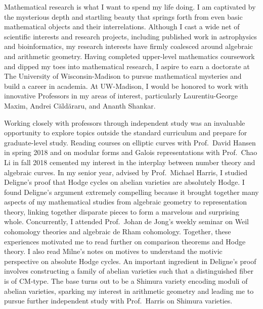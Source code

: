 \documentclass[11pt]{article}
\begin{document}
Mathematical research is what I want to spend my life doing. I am captivated by the mysterious depth and startling beauty that springs forth from even basic mathematical objects and their interrelations. Although I cast a wide net of scientific interests and research projects, including published work in astrophysics and bioinformatics, my research interests have firmly coalesced around algebraic and arithmetic geometry. Having completed upper-level mathematics coursework and dipped my toes into mathematical research, I aspire to earn a doctorate at The University of Wisconsin-Madison to pursue mathematical mysteries and build a career in academia. At UW-Madison, I would be honored to work with innovative Professors in my areas of interest, particularly Laurentiu-George Maxim, Andrei Căldăraru, and Ananth Shankar. 
\par
Working closely with professors through independent study was an invaluable opportunity to explore topics outside the standard curriculum and prepare for graduate-level study. 
Reading courses on elliptic curves with Prof.\ David Hansen in spring 2018 and on modular forms and Galois representations with Prof.\ Chao Li in fall 2018 cemented my interest in the interplay between number theory and algebraic curves. In my senior year, advised by Prof.\ Michael Harris, I studied Deligne's proof that Hodge cycles on abelian varieties are absolutely Hodge. I found Deligne's argument extremely compelling because it brought together many aspects of my mathematical studies from algebraic geometry to representation theory, linking together disparate pieces to form a marvelous and surprising whole. Concurrently, I attended Prof.\ Johan de Jong's weekly seminar on Weil cohomology theories and algebraic de Rham cohomology. Together, these experiences motivated me to read further on comparison theorems and Hodge theory. I also read Milne's notes on motives to understand the motivic perspective on absolute Hodge cycles. An important ingredient in Deligne's proof involves constructing a family of abelian varieties such that a distinguished fiber is of CM-type. The base turns out to be a Shimura variety encoding moduli of abelian varieties, sparking my interest in arithmetic geometry and leading me to pursue further independent study with Prof.\ Harris on Shimura varieties.
\par
\end{document}
